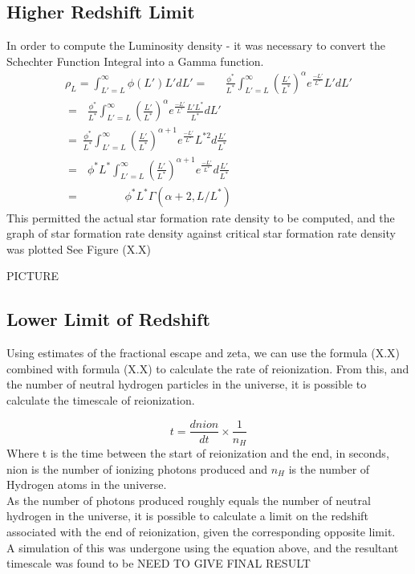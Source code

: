 \documentclass[pdf,color]{UoBnote}
\begin{document}
\subsection{Higher Redshift Limit}
In order to compute the Luminosity density - it was necessary to convert the Schechter Function Integral into a Gamma function. 
\begin{eqnarray}
\rho_L = \int^{\infty}_{L'=L} \phi(L')L'dL'=\ \ \ \ \ \ \ \frac{\phi^*}{L^*}\int^{\infty}_{L'=L}\left (\frac{L'}{L^*} \right )^{\alpha}e^\frac{-L'}{L^*}L'dL'\\
= \ \ \ \frac{\phi^*}{L^*}\int^{\infty}_{L'=L}\left (\frac{L'}{L^*}\right )^{\alpha}e^\frac{-L'}{L^*}\frac{L'L^*}{L^*}dL'\\
= \ \frac {\phi^*}{L^*}\int^{\infty}_{L'=L}\left ( \frac{L'}{L^*} \right )^{\alpha+1}e^\frac{-L'}{L^*}L^{*2}d\frac{L'}{L^*} \\
= \ \ \ \phi^*L^*\int^{\infty}_{L'=L}\left ( \frac{L'}{L^*} \right )^{\alpha+1}e^\frac{-L'}{L^*}d\frac{L'}{L^*} \\
= \ \ \ \ \ \ \ \ \ \ \ \ \ \ \ \ \ \ \phi^*L^*\Gamma(\alpha+2, L/L^*)
\end{eqnarray}
This permitted the actual star formation rate density to be computed, and the graph of star formation rate density against critical star formation rate density was plotted See Figure (X.X)

PICTURE

\subsection{Lower Limit of Redshift}
Using estimates of the fractional escape and zeta, we can use the formula (X.X) combined with formula (X.X) to calculate the rate of reionization. From this, and the number of neutral hydrogen particles in the universe, it is possible to calculate the timescale of reionization. 

\begin{equation}
t =\frac{dnion}{dt}\times \frac{1}{n_H}
\end{equation}
Where t is the time between the start of reionization and the end, in seconds, nion is the number of ionizing photons produced and $n_H$ is the number of Hydrogen atoms in the universe. \\
\newline
As the number of photons produced roughly equals the number of neutral hydrogen in the universe, it is possible to calculate a limit on the redshift associated with the end of reionization, given the corresponding opposite limit. \\
\newline
A simulation of this was undergone using the equation above, and the resultant timescale was found to be NEED TO GIVE FINAL RESULT
\end{document}
